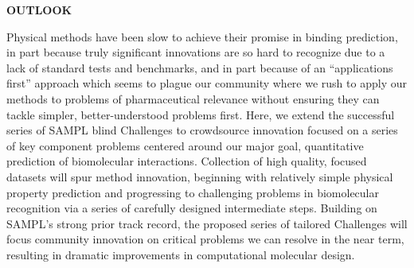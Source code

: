 \documentclass[11pt]{article}
\begin{document}
{\Large \bf OUTLOOK}

Physical methods have been slow to achieve their promise in binding prediction, in part because truly significant innovations are so hard to recognize due to a lack of standard tests and benchmarks, and in part because of an ``applications first'' approach which seems to plague our community where we rush to apply our methods to problems of pharmaceutical relevance without ensuring they can tackle simpler, better-understood problems first.
Here, we extend the successful series of SAMPL blind Challenges to crowdsource innovation focused on a series of key component problems centered around our major goal, quantitative prediction of biomolecular interactions. 
Collection of high quality, focused datasets will spur method innovation, beginning with relatively simple physical property prediction and progressing to challenging problems in biomolecular recognition via a series of carefully designed intermediate steps.
Building on SAMPL's strong prior track record, the proposed series of tailored Challenges will focus community innovation on critical problems we can resolve in the near term, resulting in dramatic improvements in computational molecular design.


\eject

%

%

\eject

\end{document}
